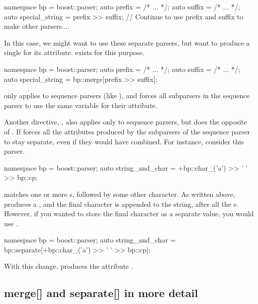 \documentclass{MyBook}
\begin{document}
\begin{code}
namespace bp = boost::parser;
auto prefix = /* ... */;
auto suffix = /* ... */;
auto special_string = prefix >> suffix;
// Continue to use prefix and suffix to make other parsers....
\end{code}

In this case, we might want to use these separate parsers, but want  to produce a single  for its attribute.  exists for this purpose.

\begin{code}
namespace bp = boost::parser;
auto prefix = /* ... */;
auto suffix = /* ... */;
auto special_string = bp::merge[prefix >> suffix];
\end{code}

 only applies to sequence parsers (like ), and forces all subparsers in the sequence parser to use the same variable for their attribute.

Another directive, , also applies only to sequence parsers, but does the opposite of . If forces all the attributes produced by the subparsers of the sequence parser to stay separate, even if they would have combined. For instance, consider this parser.

\begin{code}
namespace bp = boost::parser;
auto string_and_char = +bp::char_('a') >> ' ' >> bp::cp;
\end{code}

 matches one or more s, followed by some other character. As written above,  produces a , and the final character is appended to the string, after all the s. However, if you wanted to store the final character as a separate value, you would use .

\begin{code}
namespace bp = boost::parser;
auto string_and_char = bp::separate[+bp::char_('a') >> ' ' >> bp::cp];
\end{code}

With this change,  produces the attribute .

\subsection{merge{[}{]} and separate{[}{]} in more detail}
\end{document}
